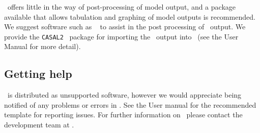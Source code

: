 \CNAME\ offers little in the way of post-processing of model output, and a package available that allows tabulation and graphing of model outputs is recommended. We suggest software such as \href{http://www.r-project.org}{\R}\ \citep{R} to assist in the post processing of \CNAME\ output. We provide the \texttt{CASAL2} \R\ package for importing the \CNAME\ output into \R\ (see the \CNAME User Manual for more detail).

\subsection{Getting help}

\CNAME\ is distributed as unsupported software, however we would appreciate being notified of any problems or errors in \CNAME. See the \CNAME User manual \citep{CASAL2} for the recommended template for reporting issues. For further information on \CNAME\, please contact the development team at \email.

